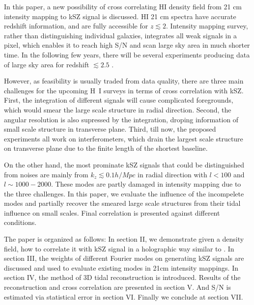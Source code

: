 \documentclass[aps,prd,twocolumn,showpacs,superscriptaddress,groupedaddress,nofootinbib]{revtex4}  %
\begin{document}
In this paper, a new possibility of cross correlating HI density field from 21 cm intensity mapping to kSZ signal is discussed. 
HI 21 cm spectra have accurate redshift information, 
and are fully accessible for $z\lesssim2$.  
Intensity mapping survey, 
rather than distinguishing individual galaxies, 
integrates all weak signals in a pixel,  
which enables it to reach high S/N and scan large sky area 
in much shorter time. 
In the following few years, there will be several experiments 
producing data of large sky area for redshift $\lesssim2.5$ 
\cite{2014SPIE.9145E..22B, 2015ApJ...798...40X, HIRAX}.

However, as feasibility is usually traded from data quality, 
there are three main challenges for the upcoming H~I surveys  
in terms of cross correlation with kSZ. 
First, the integration of different signals will cause complicated foregrounds, 
which would smear the large scale structure in radial direction\cite{DiMatteo04,Masui13}. 
Second, the angular resolution is also supressed by the integration, 
droping information of small scale structure in transverse plane. 
Third, till now, the proposed experiments all work on interferometers, 
which drain the largest scale structure on transverse plane  
due to the finite length of the shortest baseline. 

On the other hand, the most prominate kSZ signals that could be distinguished from noises  
are mainly from $k_z\lesssim0.1 h/Mpc$ in radial direction 
with $l < 100$ and $l \sim 1000-2000$. 
These modes are partly damaged in intensity mapping due to the three challenges. 
In this paper, we evaluate the 
influence of the incompelete modes
and partially recover the smeared large scale structures 
from their tidal influence on small scales\cite{2012:pen,2015:zhu}. 
Final correlation is presented against different conditions.

The paper is organized as follows: 
In section II, we demonstrate given a density field, how to correlate it with kSZ signal in a holographic way similar to \cite{Shao11}. 
In section III, the weights of different Fourier modes on generating kSZ signals 
are discussed and used to evaluate existing modes in 21cm intensity mappings. 
In section IV, the method of 3D tidal reconstruction is introduced. 
Results of the reconstruction and cross correlation are presented in section V. 
And S/N is estimated via statistical error in section VI.
Finally we conclude at section VII.
\end{document}
